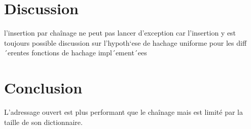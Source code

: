 \documentclass[utf8]{article}
\begin{document}
\section{Discussion}
l’insertion par chaînage ne peut pas lancer d’exception car l’insertion y est toujours possible
    discussion sur l’hypoth`ese de hachage uniforme pour les diff´erentes fonctions de hachage impl´ement´ees
\section{Conclusion}
    L'adressage ouvert est plus performant que le chaînage mais est limité par la taille de son dictionnaire.
\end{document}
